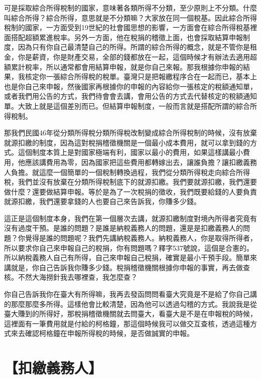 \documentclass[]{ctexbook}
\begin{document}
可是採取綜合所得稅制的國家，意味著各類所得不分類，至少原則上不分類。什麼叫綜合所得？綜合所得，意思就是不分類嘛？大家放在同一個稅基。因此綜合所得稅制的國家，一方面受到19世紀的社會國思想的影響，一方面會在綜合所得稅基裡面搭配超額累進稅率。另外一方面，他在稅捐的稽徵上面，也會採取結算申報制度，因為只有你自己最清楚自己的所得。所謂的綜合所得的概念，就是不管你是租金，你是薪資，你是財產交易，全部的錢都放在一起，這個時候才有辦法去適用超額累計稅率，所以通常都會用結算申報，就是你自己來報。那我根據你申報的結果，我核定你一張綜合所得稅的稅單。臺灣只是把報繳程序合在一起而已，基本上也是你自己來申報，然後國家再根據你的申報的內容給你一張核定的稅額通知單，或者我們用公告的方式，我們待會會去講，會用公告的方式去代替核定的稅額通知單。大致上就是這個差別而已。但結算申報制度，一般而言就是搭配所謂的綜合所得稅制。

那我們民國46年從分類所得稅分類所得稅改制變成綜合所得稅制的時候，沒有放棄就源扣繳的制度，因為這對稅捐稽徵機關是一個最小成本費用，就可以拿到錢的方式。這個制度本質上是對國家極端有利，國家以最小的費用，如果這樣講最小費用，他應該講費用為零，因為國家把這些費用都轉嫁出去，讓誰負擔？讓扣繳義務人負擔。就這麼一個簡單的一個稅制轉換過程，我們從分類所得稅走向綜合所得稅，我們並沒有放棄在分類所得稅制底下的就源扣繳。我們要就源扣繳，我們還要做什麼？還要做結算申報。等於是為了一次稅捐的徵收，我們既要給錢的人要負責就源扣繳，我們還要拿錢的人也要自己來告訴我，你賺多少錢。

這正是這個制度本身，我們在第一個層次去講，就源扣繳制度對境內所得者究竟有沒有過度干預。是誰的問題？是誰是納稅義務人的問題，還是是扣繳義務人的問題？你覺得是誰的問題呢？我們先講納稅義務人。納稅義務人，你是取得所得者，所以要求你自己來申報自己的稅捐，你有問題嗎？釋字537號說，這個是合憲的。所以納稅義務人自己有所得，自己來申報自己稅捐，確實是最小干預手段。簡單來講就是，你自己告訴我你賺多少錢。稅捐稽徵機關根據你申報的事實，再去做查核。不然大海撈針我去哪裡查，我怎麼查？

你自己告訴我你在臺大有所得嘛，我再去發函問問看臺大究竟是不是給了你自己講的那麼那麼多所得。這樣他會比較清楚，因為他可以透過勾稽的方式。我說我是從臺大賺到的所得好，那稅捐稽徵機關就去問臺大，看臺大是不是在申報稅的時候，這裡面有一筆費用就是付給的柯格鐘，那這個時候我可以做交互查核，透過這種方式來去確認柯格鐘在申報所得稅的時候，是否做誠實的申報。

\hypertarget{ux6263ux7e73ux7fa9ux52d9ux4eba-1}{%
\section{【扣繳義務人】}\label{ux6263ux7e73ux7fa9ux52d9ux4eba-1}}
\end{document}

